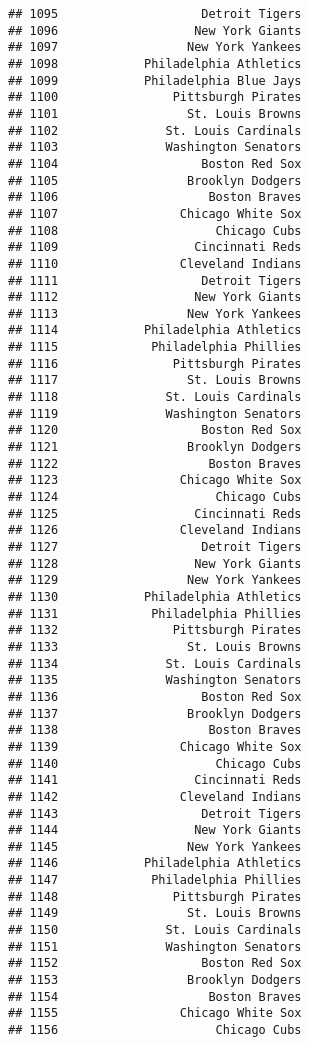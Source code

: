 \documentclass[]{article}
\begin{document}
\begin{verbatim}
## 1095                    Detroit Tigers
## 1096                   New York Giants
## 1097                  New York Yankees
## 1098            Philadelphia Athletics
## 1099            Philadelphia Blue Jays
## 1100                Pittsburgh Pirates
## 1101                  St. Louis Browns
## 1102               St. Louis Cardinals
## 1103               Washington Senators
## 1104                    Boston Red Sox
## 1105                  Brooklyn Dodgers
## 1106                     Boston Braves
## 1107                 Chicago White Sox
## 1108                      Chicago Cubs
## 1109                   Cincinnati Reds
## 1110                 Cleveland Indians
## 1111                    Detroit Tigers
## 1112                   New York Giants
## 1113                  New York Yankees
## 1114            Philadelphia Athletics
## 1115             Philadelphia Phillies
## 1116                Pittsburgh Pirates
## 1117                  St. Louis Browns
## 1118               St. Louis Cardinals
## 1119               Washington Senators
## 1120                    Boston Red Sox
## 1121                  Brooklyn Dodgers
## 1122                     Boston Braves
## 1123                 Chicago White Sox
## 1124                      Chicago Cubs
## 1125                   Cincinnati Reds
## 1126                 Cleveland Indians
## 1127                    Detroit Tigers
## 1128                   New York Giants
## 1129                  New York Yankees
## 1130            Philadelphia Athletics
## 1131             Philadelphia Phillies
## 1132                Pittsburgh Pirates
## 1133                  St. Louis Browns
## 1134               St. Louis Cardinals
## 1135               Washington Senators
## 1136                    Boston Red Sox
## 1137                  Brooklyn Dodgers
## 1138                     Boston Braves
## 1139                 Chicago White Sox
## 1140                      Chicago Cubs
## 1141                   Cincinnati Reds
## 1142                 Cleveland Indians
## 1143                    Detroit Tigers
## 1144                   New York Giants
## 1145                  New York Yankees
## 1146            Philadelphia Athletics
## 1147             Philadelphia Phillies
## 1148                Pittsburgh Pirates
## 1149                  St. Louis Browns
## 1150               St. Louis Cardinals
## 1151               Washington Senators
## 1152                    Boston Red Sox
## 1153                  Brooklyn Dodgers
## 1154                     Boston Braves
## 1155                 Chicago White Sox
## 1156                      Chicago Cubs

\end{verbatim}
\end{document}
